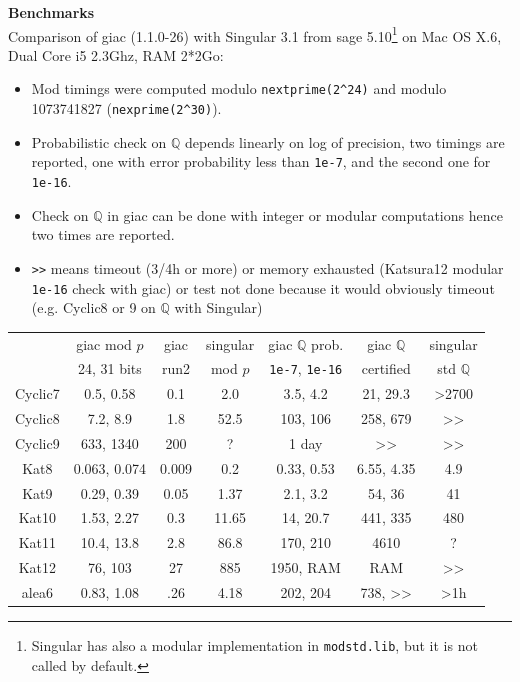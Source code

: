 \documentclass[a4paper,11pt]{article}
\begin{document}
\begin{giacjshere}
{\bf Benchmarks}\\
Comparison of giac (1.1.0-26) with Singular 3.1 from sage
5.10\footnote{Singular has also a modular implementation in
  {\tt modstd.lib}, but it is not called by default.}
on Mac OS X.6, Dual Core i5 2.3Ghz, RAM 2*2Go:
\begin{itemize}
\item Mod timings were computed modulo \verb|nextprime(2^24)|
and modulo 1073741827 (\verb|nexprime(2^30)|).
\item Probabilistic check on $\mathbb{Q}$ depends linearly on log of precision, two
timings are reported, one with error probability less than \verb|1e-7|, and
the second one for \verb|1e-16|.
\item Check on $\mathbb{Q}$ in giac can be done with integer or modular computations
hence two times are reported.
\item \verb|>>| means timeout (3/4h or more) or memory exhausted
(Katsura12 modular \verb|1e-16| check with giac) or test not done because
it would obviously timeout (e.g. Cyclic8 or 9 on $\mathbb{Q}$ with Singular)
\end{itemize}
\begin{tabular}{|c|c|c|c||c|c|c|} \hline
        & giac mod $p$ & giac & singular & giac $\mathbb{Q}$ prob. & giac $\mathbb{Q}$  & singular \\ 
        & 24, 31 bits & run2 & mod $p$ & \verb|1e-7|, \verb|1e-16| &
                                                                     certified & std $\mathbb{Q}$ \\ \hline
Cyclic7 & 0.5, 0.58 & 0.1&2.0 & 3.5, 4.2 & 21, 29.3 & >2700 \\
Cyclic8 & 7.2, 8.9 & 1.8 &52.5 & 103, 106 & 258, 679 & >> \\
Cyclic9 & 633, 1340 & 200 & ? & 1 day & >> & >> \\ \hline
Kat8 & 0.063, 0.074 & 0.009& 0.2 & 0.33, 0.53 & 6.55, 4.35 & 4.9\\
Kat9 & 0.29, 0.39 & 0.05 &1.37 & 2.1, 3.2 & 54, 36& 41\\
Kat10 & 1.53, 2.27 & 0.3& 11.65 & 14, 20.7 & 441, 335 &  480 \\
Kat11 & 10.4, 13.8 & 2.8 & 86.8 & 170, 210& 4610 & ? \\
Kat12 & 76, 103 & 27 & 885 & 1950, RAM & RAM & >> \\ \hline
alea6 & 0.83, 1.08& .26 & 4.18 & 202, 204& 738, >> & >1h\\

\end{tabular}
\end{giacjshere}
\end{document}
